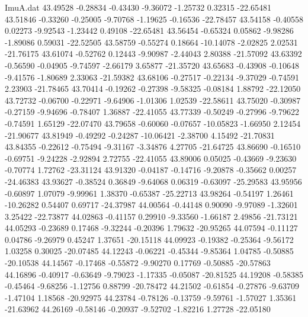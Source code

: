 \begin{filecontents}{ImuA.dat}
  43.49528   -0.28834   -0.43430   -9.36072   -1.25732    0.32315  -22.65481
  43.51846   -0.33260   -0.25005   -9.70768   -1.19625   -0.16536  -22.78457
  43.54158   -0.40558    0.02273   -9.92543   -1.23442    0.49108  -22.65481
  43.56454   -0.65324    0.05862   -9.98286   -1.89086    0.59031  -22.52505
  43.58759   -0.55274    0.18664  -10.14078   -2.02825    2.02531  -21.76175
  43.61074   -0.52762    0.12443   -9.90987   -2.44043    2.80388  -21.57092
  43.63392   -0.56590   -0.04905   -9.74597   -2.66179    3.65877  -21.35720
  43.65683   -0.43908   -0.10648   -9.41576   -1.80689    2.33063  -21.59382
  43.68106   -0.27517   -0.22134   -9.37029   -0.74591    2.23903  -21.78465
  43.70414   -0.19262   -0.27398   -9.58325   -0.08184    1.88792  -22.12050
  43.72732   -0.06700   -0.22971   -9.64906   -1.01306    1.02539  -22.58611
  43.75020   -0.30987   -0.27159   -9.94696   -0.78407    1.36887  -22.41055
  43.77339   -0.50249   -0.27996   -9.79622   -0.74591    1.65129  -22.07470
  43.79658   -0.60060   -0.07657  -10.05823   -1.66950    2.12454  -21.90677
  43.81949   -0.49292   -0.24287  -10.06421   -2.38700    4.15492  -21.70831
  43.84355   -0.22612   -0.75494   -9.31167   -3.34876    4.27705  -21.64725
  43.86690   -0.16510   -0.69751   -9.24228   -2.92894    2.72755  -22.41055
  43.89006    0.05025   -0.43669   -9.23630   -0.70774    1.72762  -23.31124
  43.91320   -0.04187   -0.14716   -9.20878   -0.35662    0.00257  -24.46383
  43.93627   -0.38524    0.36849   -9.64068    0.06319   -0.63097  -25.29583
  43.95956   -0.60897    1.07079   -9.99961    1.38370   -0.65387  -25.22713
  43.98264   -0.54197    1.26461  -10.26282    0.54407    0.69717  -24.37987
  44.00564   -0.44148    0.90090   -9.97089   -1.32601    3.25422  -22.73877
  44.02863   -0.41157    0.29910   -9.33560   -1.66187    2.49856  -21.73121
  44.05293   -0.23689    0.17468   -9.32244   -0.20396    1.79632  -20.95265
  44.07594   -0.11127    0.04786   -9.26979    0.45247    1.37651  -20.15118
  44.09923   -0.19382   -0.25364   -9.56172    1.03258    0.30025  -20.07485
  44.12243   -0.06221   -0.45344   -9.85364    1.04785   -0.50885  -20.10538
  44.14567   -0.17468   -0.55872   -9.90270    0.17769   -0.50885  -20.57863
  44.16896   -0.40917   -0.63649   -9.79023   -1.17335   -0.05087  -20.81525
  44.19208   -0.58385   -0.45464   -9.68256   -1.12756    0.88799  -20.78472
  44.21502   -0.61854   -0.27876   -9.63709   -1.47104    1.18568  -20.92975
  44.23784   -0.78126   -0.13759   -9.59761   -1.57027    1.35361  -21.63962
  44.26169   -0.58146   -0.20937   -9.52702   -1.82216    1.27728  -22.05180

\end{filecontents}
